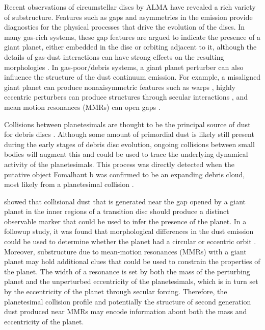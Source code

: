 \documentclass[fleqn,usenatbib]{mnras}
\begin{document}
Recent observations of circumstellar discs by ALMA have revealed a rich variety of substructure. Features such as gaps and asymmetries 
\citep{2015ApJ...808L...3A, 2016Sci...353.1519P, PhysRevLett.117.251101, 2016ApJ...820L..40A, 2016Natur.535..258C} in the emission provide 
diagnostics for the physical processes that drive the evolution of the discs. In many gas-rich systems, these gap features are argued to indicate the 
presence of a giant planet, either embedded in the disc \citep{2015MNRAS.453L..73D} or orbiting adjacent to it, although the details of gas-dust 
interactions can have strong effects on the resulting morphologies
\citep{2018ApJ...866..110D}. In gas-poor/debris systems, a giant
planet perturber can also influence 
the structure of the dust continuum emission. For example, a misaligned giant planet can produce nonaxisymmetric features such as warps 
\citep{2001A&A...370..447A}, highly eccentric perturbers can produce structures through secular interactions 
\citep{2014MNRAS.443.2541P, 2015MNRAS.448.3679P}, and mean motion resonances (MMRs) can open gaps
\citep{2015ApJ...798...83N, 2016ApJ...818..159T, 2018ApJ...857....3T}.

Collisions between planetesimals are thought to be the principal source of dust for debris discs \citep[see][]{2008ARA&A..46..339W}.  Although some 
amount of primordial dust is likely still present during the early stages of debris disc evolution, ongoing collisions between small bodies will augment 
this and could be used to trace the underlying dynamical activity of the planetesimals. This process was directly detected when the putative object 
Fomalhaut b was confirmed to be an expanding debris cloud, most likely from a planetesimal collision \citep{2020PNAS..117.9712G}. 

\citet{2013ApJ...777L..31D} showed that collisional dust that is generated near the gap opened by a giant planet in the inner regions of a transition disc should 
produce a distinct observable marker that could be used to infer the presence of the planet. In a followup study, it was found that morphological 
differences in the dust emission could be used to determine whether the planet had a circular or eccentric orbit \citep{2016ApJ...820...29D}. Moreover, 
substructure due to mean-motion resonances (MMRs) with a giant planet may hold additional clues that could be used to constrain the properties of 
the planet.  The width of a resonance is set by both the mass of the perturbing planet and the unperturbed eccentricity of the planetesimals, 
which is in turn set by the eccentricity of the planet through secular forcing. Therefore, the planetesimal collision profile and potentially the structure of second generation 
dust produced near MMRs may encode information about both the mass and eccentricity of the planet.
\end{document}
